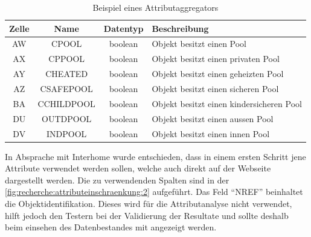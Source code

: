 \begin{table}[H] 
	\caption{Beispiel eines Attributaggregators}
	\centering
		\label{fig:recherche:attributeinschraenkung:1}
	\begin{tabular}{ | c | c | c | l | } 
		\hline 
		\rowcolor{tableheadcolor}
		\bfseries Zelle & \bfseries Name & \bfseries Datentyp & \bfseries Beschreibung \\ \hline 
		AW & CPOOL & boolean & Objekt besitzt einen Pool \\ \hline 
		AX & CPPOOL & boolean & Objekt besitzt einen privaten Pool \\ \hline 
		AY & CHEATED & boolean & Objekt besitzt einen geheizten Pool \\ \hline 
		AZ & CSAFEPOOL & boolean & Objekt besitzt einen sicheren Pool \\ \hline 
		BA & CCHILDPOOL & boolean & Objekt besitzt einen kindersicheren Pool \\ \hline 
		DU & OUTDPOOL & boolean & Objekt besitzt einen aussen Pool \\ \hline 
		DV & INDPOOL & boolean & Objekt besitzt einen innen Pool \\ \hline 
	\end{tabular}
\end{table}

In Absprache mit Interhome wurde entschieden, dass in einem ersten Schritt jene Attribute verwendet werden sollen, welche auch direkt auf der Webseite dargestellt werden. Die zu verwendenden Spalten sind in der \cref{fig:recherche:attributeinschraenkung:2} aufgeführt. Das Feld "`NREF"' beinhaltet die Objektidentifikation. Dieses wird für die Attributanalyse nicht verwendet, hilft jedoch den Testern bei der Validierung der Resultate und sollte deshalb beim einsehen des Datenbestandes mit angezeigt werden.

